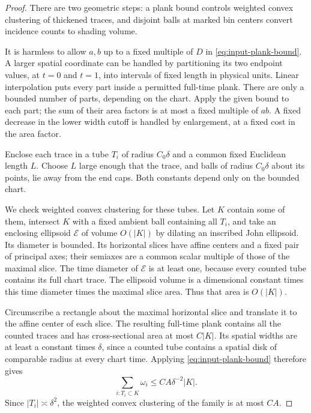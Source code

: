 \begin{proof}
There are two geometric steps: a plank bound controls weighted convex
clustering of thickened traces, and disjoint balls at marked bin centers
convert incidence counts to shading volume.

It is harmless to allow $a,b$ up to a fixed multiple of $D$ in
\eqref{eq:input-plank-bound}. A larger spatial coordinate can be
handled by partitioning its two endpoint values, at $t=0$ and
$t=1$, into intervals of fixed length in physical units.
Linear interpolation puts every part inside a permitted
full-time plank. There are only a bounded number of parts,
depending on the chart. Apply the given bound to each part;
the sum of their area factors is at most a fixed multiple
of $ab$. A fixed decrease in the lower width cutoff is handled
by enlargement, at a fixed cost in the area factor.

Enclose each trace in a tube $T_i$ of radius $C_0\delta$ and a
common fixed Euclidean length $L$. Choose $L$ large enough that the
trace, and balls of radius $C_0\delta$ about its points, lie away from the
end caps. Both constants depend only on the bounded chart.

We check weighted convex clustering for these tubes. Let $K$
contain some of them, intersect $K$ with a fixed ambient ball
containing all $T_i$, and take an enclosing ellipsoid $\mathcal E$
of volume $O(|K|)$ by dilating an inscribed John ellipsoid.
Its diameter is bounded. Its horizontal
slices have affine centers and a fixed pair of principal axes; their
semiaxes are a common scalar multiple of those of the maximal slice.
The time diameter of $\mathcal E$ is at least one, because every
counted tube contains its full chart trace. The ellipsoid volume is
a dimensional constant times this time diameter times the maximal
slice area. Thus that area is $O(|K|)$.

Circumscribe a rectangle about the maximal horizontal slice and
translate it to the affine center of each slice. The resulting full-time
plank contains all the counted traces and has cross-sectional area at
most $C|K|$.
Its spatial widths are
at least a constant times $\delta$, since a counted tube contains
a spatial disk of comparable radius at every chart time.
Applying \eqref{eq:input-plank-bound} therefore gives
\[
 \sum_{i:T_i\subset K}\omega_i\le C A\delta^{-2}|K|.
\]
Since $|T_i|\asymp\delta^2$, the weighted convex clustering of the
family is at most $CA$.


\end{proof}
